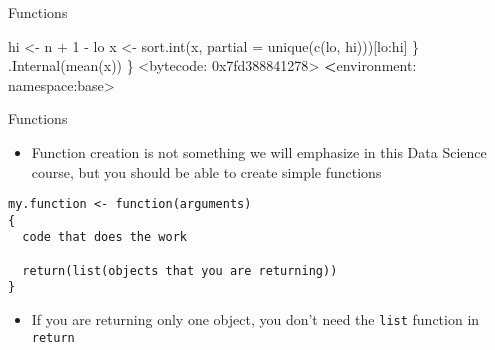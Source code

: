 \documentclass[
  ignorenonframetext,
]{beamer}
\newenvironment{Shaded}{\begin{snugshade}}{\end{snugshade}}
\newcommand{\AttributeTok}[1]{\textcolor[rgb]{0.77,0.63,0.00}{#1}}
\newcommand{\DecValTok}[1]{\textcolor[rgb]{0.00,0.00,0.81}{#1}}
\newcommand{\ErrorTok}[1]{\textcolor[rgb]{0.64,0.00,0.00}{\textbf{#1}}}
\newcommand{\FunctionTok}[1]{\textcolor[rgb]{0.00,0.00,0.00}{#1}}
\newcommand{\NormalTok}[1]{#1}
\newcommand{\OtherTok}[1]{\textcolor[rgb]{0.56,0.35,0.01}{#1}}
\newcommand{\SpecialCharTok}[1]{\textcolor[rgb]{0.00,0.00,0.00}{#1}}
\providecommand{\tightlist}{%
  \setlength{\itemsep}{0pt}\setlength{\parskip}{0pt}}
\begin{document}
\begin{frame}[fragile]{Functions}
\begin{Shaded}
\begin{Highlighting}[]
\NormalTok{        hi }\OtherTok{\textless{}{-}}\NormalTok{ n }\SpecialCharTok{+} \DecValTok{1} \SpecialCharTok{{-}}\NormalTok{ lo}
\NormalTok{        x }\OtherTok{\textless{}{-}} \FunctionTok{sort.int}\NormalTok{(x, }\AttributeTok{partial =} \FunctionTok{unique}\NormalTok{(}\FunctionTok{c}\NormalTok{(lo, hi)))[lo}\SpecialCharTok{:}\NormalTok{hi]}
\NormalTok{    \}}
    \FunctionTok{.Internal}\NormalTok{(}\FunctionTok{mean}\NormalTok{(x))}
\NormalTok{\}}
\SpecialCharTok{\textless{}}\NormalTok{bytecode}\SpecialCharTok{:} \DecValTok{0x7fd388841278}\SpecialCharTok{\textgreater{}}
\ErrorTok{\textless{}}\NormalTok{environment}\SpecialCharTok{:}\NormalTok{ namespace}\SpecialCharTok{:}\NormalTok{base}\SpecialCharTok{\textgreater{}}
\end{Highlighting}
\end{Shaded}
\end{frame}

\begin{frame}[fragile]{Functions}
\protect\hypertarget{functions-2}{}
\begin{itemize}[<+->]
\tightlist
\item
  Function creation is not something we will emphasize in this Data
  Science course, but you should be able to create simple functions
\end{itemize}

\begin{verbatim}
my.function <- function(arguments)
{
  code that does the work
  
  return(list(objects that you are returning))
}
\end{verbatim}

\begin{itemize}[<+->]
\tightlist
\item
  If you are returning only one object, you don't need the \texttt{list}
  function in \texttt{return}
\end{itemize}
\end{frame}
\end{document}
